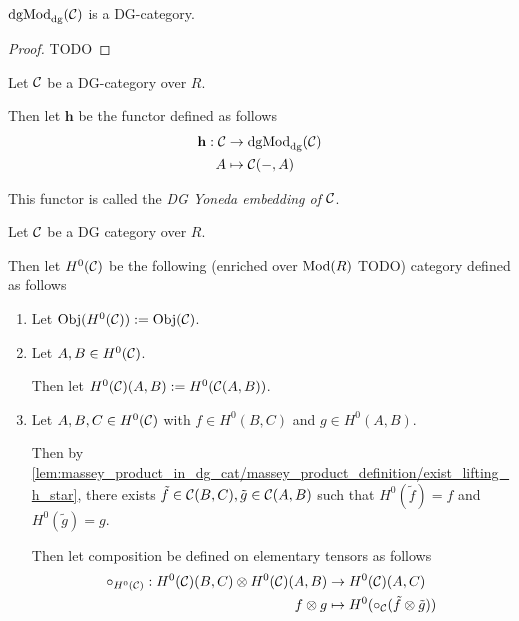 \begin{proposition}
    \( \operatorname{dgMod}_{\operatorname{dg}}({\mathcal{C}}) \) is a DG-category.
\end{proposition}
\begin{proof}
    TODO
\end{proof}

\begin{definition}
    \label{def:DG_Yoneda_embedding}
    Let \( {\mathcal{C}} \) be a DG-category over \( R \).
    
    Then let \( \mathbf{h} \) be the functor defined as follows
    \begin{align*}
        \mathbf{h}: {\mathcal{C}} &\to \operatorname{dgMod}_{\operatorname{dg}}({\mathcal{C}}) \\
        A &\mapsto {\mathcal{C}}(-, A)
    \end{align*}

    This functor is called the \emph{DG Yoneda embedding of \( {\mathcal{C}} \)}.
\end{definition}


\begin{definition}
    Let \( {\mathcal{C}} \) be a DG category over \( R \).

    Then let \( H^0({\mathcal{C}}) \) be the following (enriched over \( \operatorname{Mod}(R) \) TODO) category defined as follows
    \begin{enumerate}
        \item {
            Let \( \operatorname{Obj}(H^0({\mathcal{C}})) := \operatorname{Obj}({\mathcal{C}}) \).
        }
        \item {
            Let \( A, B \in H^0({\mathcal{C}}) \).

            Then let \( H^0({\mathcal{C}})(A, B) := H^0({\mathcal{C}}(A, B)) \).
        }
        \item {
            Let \( A, B, C \in H^0({\mathcal{C}}) \) with \( f \in H^0(B, C) \) and \( g \in H^0(A, B) \).

            Then by \autoref{lem:massey_product_in_dg_cat/massey_product_definition/exist_lifting_h_star}, there exists \( \tilde{f} \in {\mathcal{C}}(B, C), \tilde{g} \in {\mathcal{C}}(A, B) \) such that \( H^0(\tilde{f}) = f \) and \( H^0(\tilde{g}) = g \).

            Then let composition be defined on elementary tensors as follows
            \begin{align*}
                \circ_{H^0({\mathcal{C}})}: H^0({\mathcal{C}})(B, C) \otimes H^0({\mathcal{C}})(A, B) &\to H^0({\mathcal{C}})(A, C) \\
                f \otimes g &\mapsto H^0(\circ_{{\mathcal{C}}}(\tilde{f} \otimes \tilde{g}))
            \end{align*}
        }
    \end{enumerate}
\end{definition}


